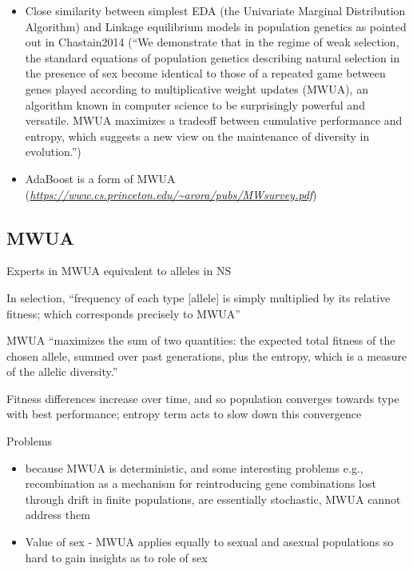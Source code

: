 	\begin{itemize}
		\item
		
		Close similarity between simplest EDA (the Univariate Marginal
		Distribution Algorithm) and Linkage equilibrium models in population
		genetics as pointed out in Chastain2014 (``We demonstrate that in
		the regime of weak selection, the standard equations of population
		genetics describing natural selection in the presence of sex become
		identical to those of a repeated game between genes played according
		to multiplicative weight updates (MWUA), an algorithm known in
		computer science to be surprisingly powerful and versatile. MWUA
		maximizes a tradeoff between cumulative performance and entropy,
		which suggests a new view on the maintenance of diversity in
		evolution.'')
		
		\item
		
		AdaBoost is a form of MWUA
		(\href{https://www.cs.princeton.edu/~arora/pubs/MWsurvey.pdf}{\emph{https://www.cs.princeton.edu/\textasciitilde{}arora/pubs/MWsurvey.pdf}})
		
	\end{itemize}

\subsection{MWUA}

\autocite{Barton2014}

	Experts in MWUA equivalent to alleles in NS

	In selection, ``frequency of each type {[}allele{]} is simply
	multiplied by its relative fitness; which corresponds precisely to
	MWUA''
	

	MWUA ``maximizes the sum of two quantities: the expected total fitness
	of the chosen allele, summed over past generations, plus the entropy,
	which is a measure of the allelic diversity.''
	
	
	Fitness differences increase over time, and so population converges
	towards type with best performance; entropy term acts to slow down
	this convergence
	

	Problems
	
	
	\begin{itemize}
		\item
		
		because MWUA is deterministic, and some interesting problems e.g.,
		recombination as a mechanism for reintroducing gene combinations
		lost through drift in finite populations, are essentially
		stochastic, MWUA cannot address them
		
		\item
		
		Value of sex - MWUA applies equally to sexual and asexual
		populations so hard to gain insights as to role of sex
		
	\end{itemize}

